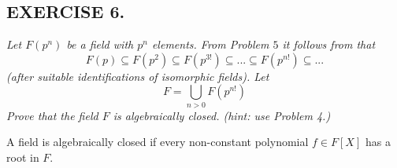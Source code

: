 \documentclass{article}
\begin{document}
\subsection*{EXERCISE 6.}
{\color{pink}\emph{Let $F(p^n)$ be a field with $p^n$ elements. From Problem $5$ it follows from that}
$$F(p)\subseteq F(p^2)\subseteq F(p^{3!})\subseteq...\subseteq F(p^{n!})\subseteq...$$
\emph{(after suitable identifications of isomorphic fields). Let}
$$F=\bigcup\limits_{n>0}F(p^{n!})$$
\emph{Prove that the field $F$ is algebraically closed. (hint: use Problem 4.)}
}
\smallskip

A field is algebraically closed if every non-constant polynomial $f\in F[X]$ has a root in $F$.
\end{document}
